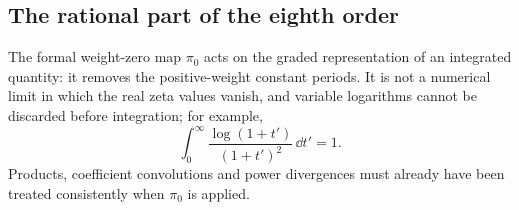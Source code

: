 \subsection{The rational part of the eighth order}\label{sri:app:dualC:C8rational}
The formal weight-zero map $\pi_0$ acts on the graded representation of an integrated quantity: it removes the
positive-weight constant periods. It is not a numerical limit in which the real zeta values vanish, and variable
logarithms cannot be discarded before integration; for example,
\begin{equation}
 \int_0^\infty\frac{\log(1+t')}{(1+t')^2}\,\dd t'=1.
\end{equation}
Products, coefficient convolutions and power divergences must already have been treated consistently when $\pi_0$ is
applied.

